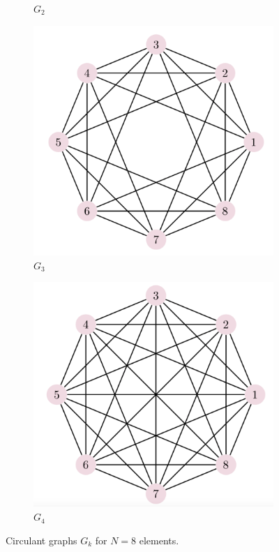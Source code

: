 \documentclass[../../dissertation.tex]{subfiles}
\begin{document}
\begin{figure}[!h]
\begin{subfigure}[t]{.23\textwidth}
    \caption{$G_2$}
  \end{subfigure}
  \begin{subfigure}[t]{.23\textwidth}
    \centering
    \includegraphics[width=\linewidth]{img/Qiskit/ContQuantumWalk/Graphs/graph2.png}
    \caption{$G_3$}
  \end{subfigure}
  \begin{subfigure}[t]{.23\textwidth}
    \centering
    \includegraphics[width=\linewidth]{img/Qiskit/ContQuantumWalk/Graphs/graph3.png}
    \caption{$G_4$}
  \end{subfigure}
  \caption{Circulant graphs $G_k$ for $N=8$ elements.}
  \label{fig:circulantGraphs}
\end{figure}\par
\end{document}
